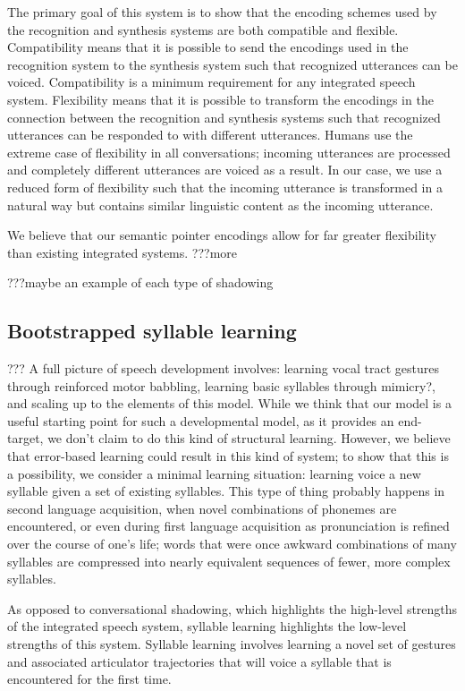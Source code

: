 The primary goal of this system is to show that
the encoding schemes used by
the recognition and synthesis systems
are both compatible and flexible.
Compatibility means that it is possible
to send the encodings used in the recognition system
to the synthesis system such that
recognized utterances can be voiced.
Compatibility is a minimum requirement
for any integrated speech system.
Flexibility means that it is possible
to transform the encodings
in the connection between
the recognition and synthesis systems
such that recognized utterances
can be responded to with different utterances.
Humans use the extreme case of flexibility
in all conversations;
incoming utterances are processed
and completely different utterances
are voiced as a result.
In our case, we use a reduced form
of flexibility such that the incoming utterance
is transformed in a natural way
but contains similar linguistic content
as the incoming utterance.

We believe that our semantic pointer encodings
allow for far greater flexibility
than existing integrated systems.
???more

???maybe an example of each type of shadowing

\subsection{Bootstrapped syllable learning}

??? A full picture of speech development involves:
learning vocal tract gestures
through reinforced motor babbling,
learning basic syllables
through mimicry?,
and scaling up to the elements of this model.
While we think that our model
is a useful starting point for such
a developmental model,
as it provides an end-target,
we don't claim to do this kind of structural learning.
However, we believe that error-based learning
could result in this kind of system;
to show that this is a possibility,
we consider a minimal learning situation:
learning voice a new syllable
given a set of existing syllables.
This type of thing probably happens
in second language acquisition,
when novel combinations of phonemes
are encountered,
or even during first language acquisition
as pronunciation is refined over
the course of one's life;
words that were once awkward combinations
of many syllables are compressed into
nearly equivalent sequences of fewer,
more complex syllables.

As opposed to conversational shadowing,
which highlights the high-level strengths
of the integrated speech system,
syllable learning highlights
the low-level strengths of this system.
Syllable learning involves
learning a novel set of gestures
and associated articulator trajectories
that will voice a syllable
that is encountered for the first time.


